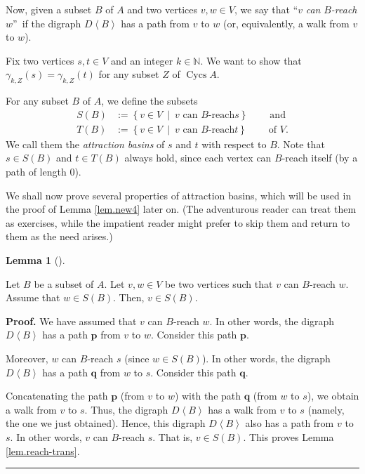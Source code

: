 \documentclass[numbers=enddot,12pt,final,onecolumn,notitlepage]{scrartcl}%
\theoremstyle{definition}
\newtheorem{lem}[theo]{Lemma}
\newenvironment{lemma}[1][]
{\begin{lem}[#1]\begin{leftbar}}
{\end{leftbar}\end{lem}}
\newenvironment{proof}[1][Proof]{\noindent\textbf{#1.} }{\ \rule{0.5em}{0.5em}}
\theoremstyle{plainsl}
\begin{document}
Now, given a subset $B$ of $A$ and two vertices $v,w\in V$, we say that
\textquotedblleft$v$ \emph{can }$B$\emph{-reach} $w$\textquotedblright\ if the
digraph $D\left\langle B\right\rangle $ has a path from $v$ to $w$ (or,
equivalently, a walk from $v$ to $w$).

Fix two vertices $s,t\in V$ and an integer $k\in\mathbb{N}$. We want to show
that $\gamma_{k,Z}\left(  s\right)  =\gamma_{k,Z}\left(  t\right)  $ for any
subset $Z$ of $\operatorname{Cycs} A$.

For any subset $B$ of $A$, we define the subsets%
\begin{align*}
S\left(  B\right)   &  :=\left\{  v\in V\ \mid\ v\text{ can }B\text{-reach
}s\right\}  \ \ \ \ \ \ \ \ \ \ \text{and}\\
T\left(  B\right)   &  :=\left\{  v\in V\ \mid\ v\text{ can }B\text{-reach
}t\right\}  \ \ \ \ \ \ \ \ \ \ \text{of }V.
\end{align*}
We call them the \emph{attraction basins} of $s$ and $t$ with respect to $B$.
Note that $s\in S\left(  B\right)  $ and $t\in T\left(  B\right)  $ always
hold, since each vertex can $B$-reach itself (by a path of length $0$).

We shall now prove several properties of attraction basins, which will be used
in the proof of Lemma \ref{lem.new4} later on. (The adventurous reader can
treat them as exercises, while the impatient reader might prefer to skip them
and return to them as the need arises.)

\begin{lemma}
\label{lem.reach-trans}Let $B$ be a subset of $A$. Let $v,w\in V$ be two
vertices such that $v$ can $B$-reach $w$. Assume that $w\in S\left(  B\right)
$. Then, $v\in S\left(  B\right)  $.
\end{lemma}

\begin{proof}
We have assumed that $v$ can $B$-reach $w$. In other words, the digraph
$D\left\langle B\right\rangle $ has a path $\mathbf{p}$ from $v$ to $w$.
Consider this path $\mathbf{p}$.

Moreover, $w$ can $B$-reach $s$ (since $w\in S\left(  B\right)  $). In other
words, the digraph $D\left\langle B\right\rangle $ has a path $\mathbf{q}$
from $w$ to $s$. Consider this path $\mathbf{q}$.

Concatenating the path $\mathbf{p}$ (from $v$ to $w$) with the path
$\mathbf{q}$ (from $w$ to $s$), we obtain a walk from $v$ to $s$. Thus, the
digraph $D\left\langle B\right\rangle $ has a walk from $v$ to $s$ (namely,
the one we just obtained). Hence, this digraph $D\left\langle B\right\rangle $
also has a path from $v$ to $s$. In other words, $v$ can $B$-reach $s$. That
is, $v\in S\left(  B\right)  $. This proves Lemma \ref{lem.reach-trans}.
\end{proof}
\end{document}
